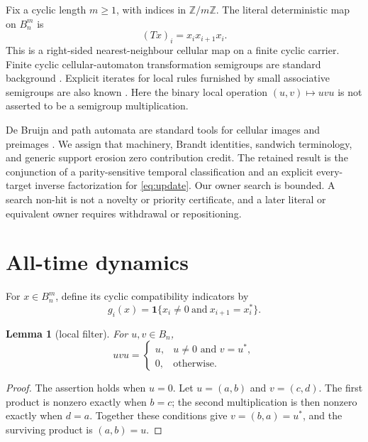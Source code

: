 \documentclass[a4paper,10pt]{amsart}
\newtheorem{lemma}[theorem]{Lemma}
\theoremstyle{remark}
\newcommand{\Bn}{B_n}
\begin{document}
Fix a cyclic length $m\geq1$, with indices in $\mathbb Z/m\mathbb Z$.  The
literal deterministic map on $\Bn^m$ is
\begin{equation}\label{eq:update}
 (Tx)_i=x_i x_{i+1}x_i.
\end{equation}
This is a right-sided nearest-neighbour cellular map on a finite cyclic
carrier.  Finite cyclic cellular-automaton transformation semigroups are
standard background \cite{CastilloRamirezGadouleau2016}.  Explicit iterates
for local rules furnished by small associative semigroups are also known
\cite{Fuks2025}.  Here the binary local operation $(u,v)\mapsto uvu$ is not
asserted to be a semigroup multiplication.

De Bruijn and path automata are standard tools for cellular images and
preimages \cite{Salo2023}.  We assign that machinery, Brandt identities,
sandwich terminology, and generic support erosion zero contribution credit.
The retained result is the conjunction of a parity-sensitive temporal
classification and an explicit every-target inverse factorization for
\eqref{eq:update}.  Our owner search is bounded.  A search non-hit is not a
novelty or priority certificate, and a later literal or equivalent owner
requires withdrawal or repositioning.

\section{All-time dynamics}

For $x\in\Bn^m$, define its cyclic compatibility indicators by
\begin{equation}\label{eq:good}
 g_i(x)=\boldsymbol{1}\{x_i\ne0\ \text{and}\ x_{i+1}=x_i^*\}.
\end{equation}

\begin{lemma}[local filter]\label{lem:filter}
For $u,v\in\Bn$,
\begin{equation}\label{eq:filter}
 uvu=\begin{cases}u,&u\ne0\text{ and }v=u^*,\\0,&\text{otherwise}.
 \end{cases}
\end{equation}
\end{lemma}

\begin{proof}
The assertion holds when $u=0$.  Let $u=(a,b)$ and $v=(c,d)$.  The first
product is nonzero exactly when $b=c$; the second multiplication is then
nonzero exactly when $d=a$.  Together these conditions give $v=(b,a)=u^*$,
and the surviving product is $(a,b)=u$.
\end{proof}
\end{document}
